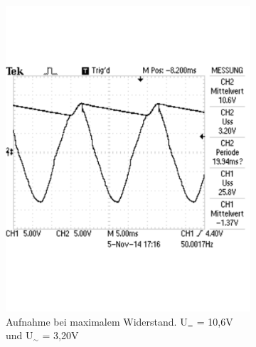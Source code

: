 \documentclass[12pt,a4paper]{article}
\begin{document}
\begin{figure}[H]
        \centering
        \begin{subfigure}[b]{0.48\textwidth}
                \includegraphics[width=\textwidth , scale = 0.4]{2_4_100F_1.pdf}
                \caption[Aufnahme bei maximalem Widerstand. U$_{=}$ = 10,6V und U$_\sim$ = 3,20V]{Aufnahme bei maximalem Widerstand. U$_{=}$ = 10,6V und U$_\sim$ = 3,20V}
 				 \label{fig:2_4_100F_1}
        \end{subfigure}%
        \hfill
        \begin{subfigure}[b]{0.48\textwidth}

\end{subfigure}
\end{figure}
\end{document}

